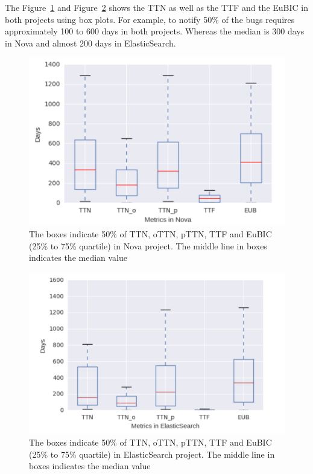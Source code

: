 \documentclass[10pt, conference]{IEEEtran}
\begin{document}
The Figure~\ref{fig:meansOfNova} and Figure~\ref{fig:meansOfES} shows the TTN as well as the TTF and the EuBIC in both projects using box plots. For example, to notify 50\% of the bugs requires approximately 100 to 600 days in both projects. Whereas the median is 300 days in Nova and almost 200 days in ElasticSearch.  

\begin{figure}[ht]
\centering
\includegraphics[width=\columnwidth]{boxplotNova.png}
\caption{The boxes indicate 50\% of TTN, oTTN, pTTN, TTF and EuBIC (25\% to 75\% quartile) in Nova project. The middle line in boxes indicates the median value}
\label{fig:meansOfNova}       %
\end{figure}

\begin{figure}[ht]
\centering
\includegraphics[width=\columnwidth]{boxplotES.png}
\caption{The boxes indicate 50\% of TTN, oTTN, pTTN, TTF and EuBIC (25\% to 75\% quartile) in ElasticSearch project. The middle line in boxes indicates the median value}
\label{fig:meansOfES}       %
\end{figure}
\end{document}
